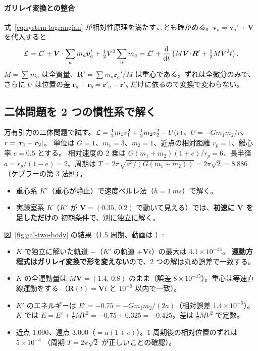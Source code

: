 \paragraph{ガリレイ変換との整合}
式~\eqref{eq:system-lagrangian} が相対性原理を満たすことも確かめる。$\bm v_a=\bm v_a'+\bm V$ を代入すると
\begin{equation}
  \mathcal{L}=\mathcal{L}'+\bm V\cdot\sum_am_a\bm v_a'+\tfrac12V^2\sum_am_a
  =\mathcal{L}'+\frac{\mathrm{d} }{\mathrm{d} t}\left(M\bm V\!\cdot\!\bm R'+\tfrac12MV^2t\right).
\end{equation}
$M=\sum m_a$ は全質量、$\bm R'=\sum m_a\bm r_a'/M$ は重心である。ずれは全微分のみで、
さらに $U$ は位置の差 $\bm r_a-\bm r_b=\bm r'_a-\bm r'_b$ だけに依るので変換で変わらない。

\subsection{二体問題を 2 つの慣性系で解く}

万有引力の二体問題で試す。$\mathcal{L}=\tfrac12m_1v_1^2+\tfrac12m_2v_2^2-U(r)$、$U=-Gm_1m_2/r$、$r=\left\lvert \bm r_1-\bm r_2\right\rvert$。
単位は $G=1$、$m_1=3$、$m_2=1$、近点の相対距離 $r_p=1$、離心率 $e=0.5$ とする。
相対速度の 2 乗は $G(m_1+m_2)(1+e)/r_p=6$、長半径 $a=r_p/(1-e)=2$、周期は
$T=2\pi\sqrt{a^3/(G(m_1+m_2))}=2\pi\sqrt2=8.886$（ケプラーの第 3 法則）。

\begin{itemize}
  \item 重心系 $K'$（重心が静止）で速度ベルレ法（$h=\qty{1}{ms}$）で解く。
  \item 実験室系 $K$（$K'$ が $\bm V=(0.35,\,0.2)$ で動いて見える）では、\textbf{初速に $\bm V$ を足しただけ}の
    初期条件で、別に独立に解く。
\end{itemize}


図~\ref{fig:gal-two-body} の結果（1.5 周期、動画は ）:
\begin{itemize}
  \item $K$ で独立に解いた軌道 $-$（$K'$ の軌道 $+\bm Vt$）の最大は $4.1\times10^{-13}$。
    \textbf{運動方程式はガリレイ変換で形を変えない}ので、2 つの解は丸め誤差で一致する。
  \item $K$ の全運動量は $M\bm V=(1.4,\,0.8)$ のまま（誤差 $8\times10^{-15}$）。重心は等速直線運動をする
    （$\bm R(t)=\bm Vt$ と $10^{-9}$ 以内で一致）。
  \item $K'$ のエネルギーは $E'=-0.75=-Gm_1m_2/(2a)$（相対誤差 $1.4\times10^{-6}$）。
    $K$ では $E=E'+\tfrac12MV^2=-0.75+0.325=-0.425$。差は $\tfrac12MV^2$ で定数。
  \item 近点 $1.000$、遠点 $3.000$（$=a(1+e)$）。1 周期後の相対位置のずれは $5\times10^{-4}$
    （周期 $T=2\pi\sqrt2$ が正しいことの確認）。
\end{itemize}

